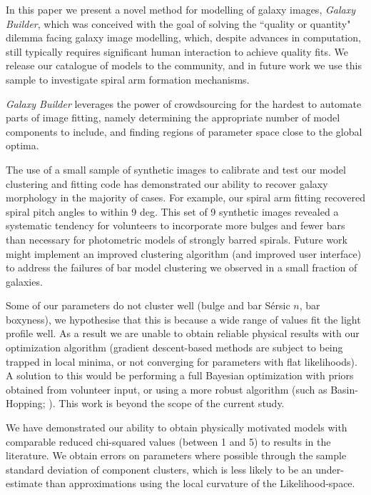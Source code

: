 \documentclass[main\.tex]{subfiles}
\begin{document}
\label{sec:conclusions}
In this paper we present a novel method for modelling of galaxy images, \textit{Galaxy Builder}, which was conceived with the goal of solving the ``quality or quantity" dilemma facing galaxy image modelling, which, despite advances in computation, still typically requires significant human interaction to achieve quality fits. We release our catalogue of models to the community, and in future work we use this sample to investigate spiral arm formation mechanisms.

\textit{Galaxy Builder} leverages the power of crowdsourcing for the hardest to automate parts of image fitting, namely determining the appropriate number of model components to include, and finding regions of parameter space close to the global optima.

The use of a small sample of synthetic images to calibrate and test our model clustering and fitting code has demonstrated our ability to recover galaxy morphology in the majority of cases. For example, our spiral arm fitting recovered spiral pitch angles to within 9 deg. This set of 9 synthetic images revealed a systematic tendency for volunteers to incorporate more bulges and fewer bars than necessary for photometric models of strongly barred spirals. Future work might implement an improved clustering algorithm (and improved user interface) to address the failures of bar model clustering we observed in a small fraction of galaxies.

Some of our parameters do not cluster well (bulge and bar S\'ersic $n$, bar boxyness), we hypothesise that this is because a wide range of values fit the light profile well. As a result we are unable to obtain reliable physical results with our optimization algorithm (gradient descent-based methods are subject to being trapped in local minima, or not converging for parameters with flat likelihoods). A solution to this would be performing a full Bayesian optimization with priors obtained from volunteer input, or using a more robust algorithm (such as Basin-Hopping; \citealt{1998cond.mat..3344W}). This work is beyond the scope of the current study.

We have demonstrated our ability to obtain physically motivated models with comparable reduced chi-squared values (between 1 and 5) to results in the literature. We obtain errors on parameters where possible through the sample standard deviation of component clusters, which is less likely to be an under-estimate than approximations using the local curvature of the Likelihood-space.
\end{document}
